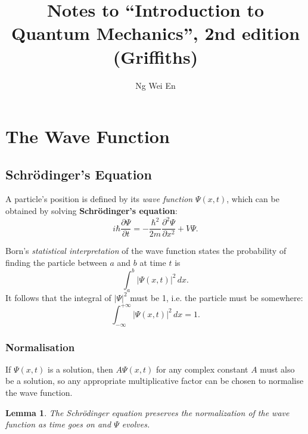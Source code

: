 \documentclass{article}
\title{Notes to ``Introduction to Quantum Mechanics'', 2nd edition (Griffiths)}
\author{Ng Wei En}
\newtheorem{lemma}{Lemma}
\begin{document}
\maketitle

\section{The Wave Function}

\subsection{Schr\"{o}dinger's Equation}

A particle's position is defined by its \emph{wave function} $\Psi(x, t)$,
which can be obtained by solving \textbf{Schr\"{o}dinger's equation}:
\begin{equation} \label{eq:sch-eqn}
  \boxed{
    i\hbar \frac{\partial \Psi}{\partial t}
    = -\frac{\hbar^2}{2m} \frac{\partial^2 \Psi}{\partial x^2} + V\Psi.
  }
\end{equation}

Born's \emph{statistical interpretation} of the wave function states the
probability of finding the particle between $a$ and $b$ at time $t$ is \[
  \int_a^b |\Psi(x, t)|^2 \,dx.
\] It follows that the integral of $|\Psi|^2$
must be 1, i.e. the particle must be somewhere:
\begin{equation} \label{eq:sch-prob}
  \boxed{
    \int_{-\infty}^{+\infty} |\Psi(x, t)|^2 \,dx = 1.
  }
\end{equation}

\subsubsection{Normalisation}

If $\Psi(x, t)$ is a solution, then $A \Psi(x, t)$ for any complex constant $A$
must also be a solution, so any appropriate multiplicative factor can be chosen
to normalise the wave function.

\begin{lemma}
  The Schr\"{o}dinger equation preserves the normalization of the wave function
  as time goes on and $\Psi$ evolves.
\end{lemma}
\end{document}

